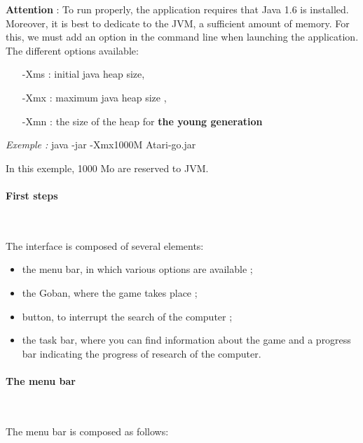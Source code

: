 \documentclass[a4paper,10pt,twoside]{report}
\begin{document}
        
        \textbf{Attention} : To run properly, the application requires that Java 1.6 is installed. Moreover, it is best to dedicate to the JVM, a sufficient amount of memory. For this, we must add an option in the command line when launching the application. The different options available:

	\vspace{3mm}
        
        \begin{itemize}
        \item[-Xms]{: initial java heap size,}
	\item[-Xmx]{: maximum java heap size ,}
	\item[-Xmn]{: 	the size of the heap for \textbf{the young generation} }\\
	\end{itemize}

	\textit{Exemple :}  java -jar -Xmx1000M Atari-go.jar

	In this exemple, 1000 Mo are reserved to JVM. 

	\paragraph{First steps}
        ~~\vspace{2mm}

        The interface is composed of several elements:
        \vspace{3mm}

        \begin{itemize}
        \item{the menu bar, in which various options are available ;}
        \item{the Goban, where the game takes place ;}
        \item{button, to interrupt the search of the computer ;}
        \item{the task bar, where you can find information about the game and a progress bar indicating the progress of research of the computer.}
        \end{itemize}



        \paragraph{The menu bar}
        ~~\vspace{2mm}

        The menu bar is composed as follows:
        \vspace{3mm}
        
\end{document}
